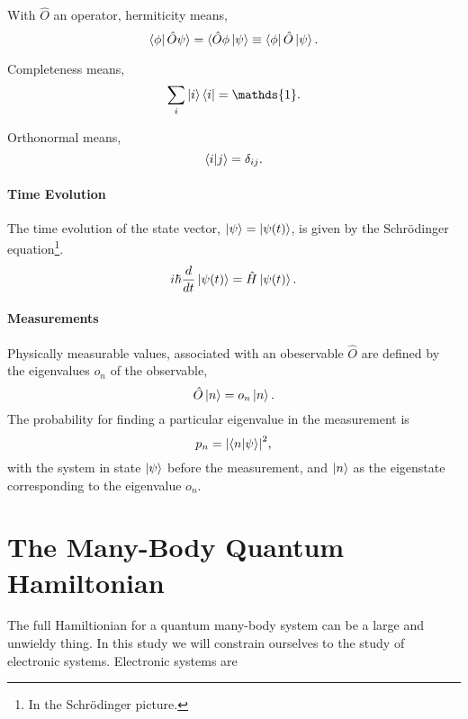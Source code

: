     With $\hat{O}$ an operator, hermiticity means,
    \begin{equation}
        \bra{\phi}\hat{O}\psi\rangle = \langle\hat{O}\phi\ket{\psi} \equiv \bra{\phi} \hat{O} \ket{\psi}.
    \end{equation}

    Completeness means,
    \begin{equation}
        \sum_i \ket{i}\bra{i} = \mathds{1}.
    \end{equation}

    Orthonormal means,
    \begin{equation}
        \braket{i}{j} = \delta_{ij}.
    \end{equation}

    \paragraph{Time Evolution}
    The time evolution of the state vector, $\ket{\psi} = \ket{\psi (t)}$, is given by the Schrödinger
    equation\footnote{In the Schrödinger picture.}.
    \begin{equation}
        i\hbar \frac{d}{dt} \ket{\psi (t)} = \hat{H} \ket{\psi (t)}.
    \end{equation}

    \paragraph{Measurements}
    Physically measurable values, associated with an obeservable $\hat{O}$ are defined by the 
    eigenvalues $o_n$ of the observable,
    \begin{equation}
        \hat{O}\ket{n} = o_n\ket{n}.
    \end{equation}
    The probability for finding a particular eigenvalue in the measurement is
    \begin{equation}
        p_n = \abs{\braket{n}{\psi}}^2,
    \end{equation}
    with the system in state $\ket{\psi}$ before the measurement, and $\ket{n}$ as the 
    eigenstate corresponding to the eigenvalue $o_n$.

\section{The Many-Body Quantum Hamiltonian}

    The full Hamiltionian for a quantum many-body system can be a large 
    and unwieldy thing. In this study we will constrain ourselves to the study of
    electronic systems. Electronic systems are 

